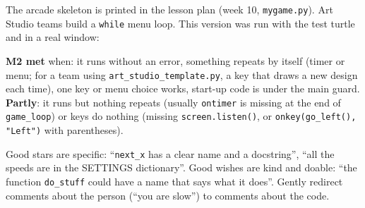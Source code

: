 \begin{answer}
The arcade skeleton is printed in the lesson plan (week 10, \texttt{mygame.py}). Art Studio teams
build a \texttt{while} menu loop. This version was run with the test turtle and in a real window:
\textbf{M2 met} when: it runs without an error, something repeats by itself (timer or menu; for a team
using \texttt{art\_studio\_template.py}, a key that draws a new design each time), one key
or menu choice works, start-up code is under the main guard. \textbf{Partly}: it runs but nothing
repeats (usually \texttt{ontimer} is missing at the end of \texttt{game\_loop}) or keys do nothing
(missing \texttt{screen.listen()}, or \texttt{onkey(go\_left(), "Left")} with parentheses).
\end{answer}

\begin{answer}
Good stars are specific: \enquote{\texttt{next\_x} has a clear name and a docstring},
\enquote{all the speeds are in the SETTINGS dictionary}. Good wishes are kind and doable:
\enquote{the function \texttt{do\_stuff} could have a name that says what it does}. Gently redirect
comments about the person (\enquote{you are slow}) to comments about the code.
\end{answer}

